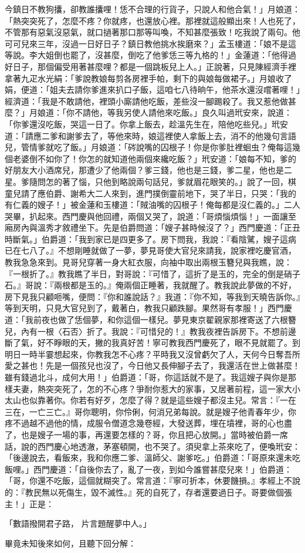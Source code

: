 今鎮日不教狗攮，卻教誰攮哩！恁不合理的行貨子，只說人和他合氣！」月娘道：「熱突突死了，怎麼不疼？你就疼，也還放心裡。那裡就這般顯出來！人也死了，不管那有惡氣沒惡氣，就口撾著那口那等叫喚，不知甚麼張致！吃我說了兩句。他可可兒來三年，沒過一日好日子？鎮日教他挑水挨磨來？」孟玉樓道：「娘不是這等說。李大姐倒也罷了，沒甚麼，倒吃了他爹恁三等九格的！」金蓮道：「他得過好日子，那個偏受用著甚麼哩？都是一個跳板兒上人。」正說著，只見陳經濟手裡拿著九疋水光絹：「爹說教娘每剪各房裡手帕，剩下的與娘每做裙子。」月娘收了娟，便道：「姐夫去請你爹進來扒口子飯，這咱七八待晌午，他茶水還沒嚐著哩！」經濟道：「我是不敢請他，裡頭小廝請他吃飯，差些沒一腳踢殺了。我又惹他做甚麼？」月娘道：「你不請他，等我另使人請他來吃飯。」良久叫過玳安來，說道：「你爹還沒吃飯，哭這一日了。你拿上飯去，趁溫先生在，陪他吃些兒。」玳安道：「請應二爹和謝爹去了，等他來時，娘這裡使人拿飯上去，消不的他幾句言語兒，管情爹就吃了飯。」月娘道：「硶說嘴的囚根子！你是你爹肚裡蛔虫？俺每這幾個老婆倒不如你了！你怎的就知道他兩個來纔吃飯？」玳安道：「娘每不知，爹的好朋友大小酒席兒，那遭少了他兩個？爹三錢，他也是三錢，爹二星，他也是二星。爹隨問怎的著了惱，只他到略說兩句話兒，爹就眉花眼笑的。」說了一回，棋童兒請了應伯爵、謝希大二人來到，進門撲倒靈前地下，哭了半日，只哭：「我的有仁義的嫂子！」被金蓮和玉樓道：「賊油嘴的囚根子！俺每都是沒仁義的。」二人哭畢，扒起來。西門慶與他回禮，兩個又哭了，說道：「哥煩惱煩惱！」一面讓至廂房內與溫秀才敘禮坐下。先是伯爵問道：「嫂子甚時候沒了？」西門慶道：「正丑時斷氣。」伯爵道：「我到家已是四更多了。房下問我，我說：『看陰騭，嫂子這病已在七八了。』不想剛睡就做了一夢，夢見哥使大官兒來請我，說家裡吃慶官酒，教我急急來到。見哥兒穿著一身大紅衣服，向袖中取出兩根玉簪兒與我瞧，說：『一根折了。』教我瞧了半日，對哥說：『可惜了，這折了是玉的，完全的倒是硝子石。』哥說：『兩根都是玉的。』俺兩個正睡著，我就醒了。教我說此夢做的不好，房下見我只顧咂嘴，便問：『你和誰說話？』我道：『你不知，等我到天曉告訴你。』等到天明，只見大官兒到了，戴著白，教我只顧跌腳。果然哥有孝服！」西門慶道：「我前夜也做了恁個夢，和你這個一樣兒。夢見東京翟親家那裡寄送了六根簪兒，內有一根〈石否〉折了。我說：『可惜兒的！』教我夜裡告訴房下。不想前邊斷了氣，好不睜眼的天，撇的我真好苦！寧可教我西門慶死了，眼不見就罷了。到明日一時半霎想起來，你教我怎不心疼？平時我又沒曾虧欠了人，天何今日奪吾所愛之甚也！先是一個孩兒也沒了，今日他又長伸腳子去了，我還活在世上做甚麼！雖有錢過北斗，成何大用！」伯爵道：「哥，你這話就不是了。我這嫂子與你是那樣夫妻，熱突突死了，怎的不心疼？爭耐你惹大的家事，又居著前程，這一家大小太山也似靠著你。你若有好歹，怎麼了得？就是這些嫂子都沒主兒。常言：『一在三在，一亡三亡。』哥你聰明，你伶俐，何消兄弟每說。就是嫂子他青春年少，你疼不過越不過他的情，成服令僧道念幾卷經，大發送葬，埋在墳裡，哥的心也盡了，也是嫂子一場的事，再還要怎樣的？哥，你且把心放開。」當時被伯爵一席話，說的西門慶心地透澈，茅塞頓開，也不哭了。須臾拿上茶來吃了，便喚玳安：「後邊說去，看飯來，我和你應二爹、溫師父、謝爹吃。」伯爵道：「哥原來還未吃飯哩。」西門慶道：「自後你去了，亂了一夜，到如今誰嘗甚麼兒來！」伯爵道：「哥，你還不吃飯，這個就糊突了。常言道：『寧可折本，休要饑損。』孝經上不說的：『教民無以死傷生，毀不滅性。』死的自死了，存者還要過日子。哥要做個張主！」正是：

「數語撥開君子路，  片言題醒夢中人。」

畢竟未知後來如何，且聽下回分解：

